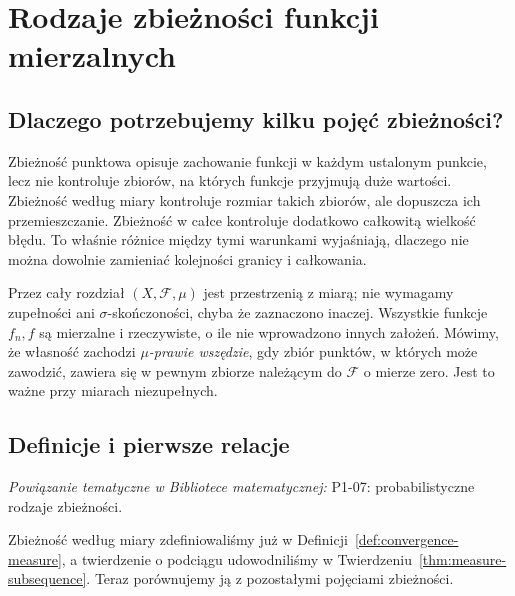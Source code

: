 \chapter{Rodzaje zbieżności funkcji mierzalnych}
\label{ch:rodzaje-zbieznosci}

\providecommand{\atlasref}[2]{#2}


\section{Dlaczego potrzebujemy kilku pojęć zbieżności?}

Zbieżność punktowa opisuje zachowanie funkcji w każdym ustalonym
punkcie, lecz nie kontroluje zbiorów, na których funkcje przyjmują
duże wartości. Zbieżność według miary kontroluje rozmiar takich
zbiorów, ale dopuszcza ich przemieszczanie. Zbieżność w całce
kontroluje dodatkowo całkowitą wielkość błędu. To właśnie różnice
między tymi warunkami wyjaśniają, dlaczego nie można dowolnie
zamieniać kolejności granicy i całkowania.

Przez cały rozdział $(X,\mathcal F,\mu)$ jest przestrzenią
z miarą; nie wymagamy zupełności ani $\sigma$-skończoności, chyba
że zaznaczono inaczej. Wszystkie funkcje $f_n,f$ są mierzalne i
rzeczywiste, o ile nie wprowadzono innych założeń. Mówimy, że
własność zachodzi \emph{$\mu$-prawie wszędzie}, gdy zbiór punktów,
w których może zawodzić, zawiera się w pewnym zbiorze należącym
do $\mathcal F$ o mierze zero. Jest to ważne przy miarach
niezupełnych.

\section{Definicje i pierwsze relacje}

\noindent\emph{Powiązanie tematyczne w Bibliotece matematycznej:} \atlasref{P1-07::ch:convergence}{P1-07: probabilistyczne rodzaje zbieżności}.


Zbieżność według miary zdefiniowaliśmy już w
Definicji~\ref{def:convergence-measure}, a twierdzenie o podciągu
udowodniliśmy w Twierdzeniu~\ref{thm:measure-subsequence}.
Teraz porównujemy ją z pozostałymi pojęciami zbieżności.


